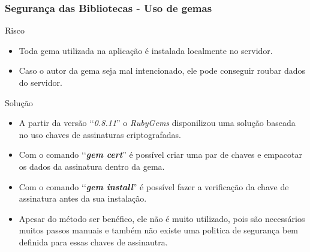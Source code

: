 \begin{frame}
 \frametitle{Segurança das Bibliotecas - Uso de gemas}
 
  \begin{block}{Risco}
   
   \begin{itemize}
   
    \item Toda gema utilizada na aplicação é instalada localmente no servidor. 
    
    \item Caso o autor da gema seja mal intencionado, ele pode conseguir roubar dados do servidor. 
    
   \end{itemize} 
   
  \end{block}
  
  \begin{block}{Solução}
   
   \begin{itemize}
   
    \item A partir da versão ‘‘\emph{0.8.11}'' o \emph{RubyGems} disponilizou uma solução baseada no uso chaves 
    de assinaturas criptografadas.
    
    \item Com o comando ‘‘\emph{\textbf{gem cert}}'' é possível criar uma par de chaves e empacotar os dados da 
    assinatura dentro da gema.
    
    \item Com o comando ‘‘\emph{\textbf{gem install}}'' é possível fazer a verificação da chave de assinatura 
    antes da sua instalação.
    
    \item Apesar do método ser benéfico, ele não é muito utilizado, pois são necessários muitos passos manuais 
    e também não existe uma politica de segurança bem definida para essas chaves de assinautra.
    
   \end{itemize}      
   
  \end{block}

\end{frame}  
 
